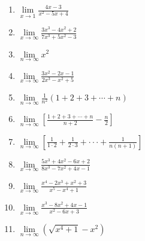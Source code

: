 \documentclass{report}
\begin{document}
\begin{multicols*}{2}
\begin{enumerate}
            \item $\lim\limits_{x\to1}{\frac{4x-3}{x^{2}-5x+4}}$
            \item $\lim\limits_{x\to\infty}{\frac{3x^{3}-4x^{2}+2}{7x^{3}+5x^{2}-3}}$
            \item $\lim\limits_{n\to\infty}x^{2}$
            \item $\lim\limits_{x\to\infty}{\frac{3x^{2}-2x-1}{2x^{3}-x^{2}+5}}$
            \item $\lim\limits_{n\to\infty}\frac{1}{n^{2}}(1+2+3+\cdots+n)$
            \item $\lim\limits_{n\to\infty}\left[{\frac{1+2+3+\cdots+n}{n+2}}-{\frac{n}{2}}\right]$
            \item $\lim\limits_{n\to\infty}\left[{\frac{1}{1\cdot2}}+{\frac{1}{2\cdot3}}+\cdot\cdot\cdot+{\frac{1}{n(n+1)}}\right]$
            \item $\lim\limits_{x\to\infty}{\frac{5x^{3}+4x^{2}-6x+2}{8x^{3}-7x^{2}+4x-1}}$
            \item $\lim\limits_{x\to\infty}{\frac{x^{4}-2x^{3}+x^{2}+3}{x^{5}-x^{4}+1}}$
            \item $\lim\limits_{x\to\infty}{\frac{x^{3}-8x^{2}+4x-1}{x^{2}-6x+3}}$
            \item $\lim\limits_{n\to\infty}(\sqrt{x^{4}+1}-x^{2})$
      \end{enumerate}
\end{multicols*}
\end{document}
